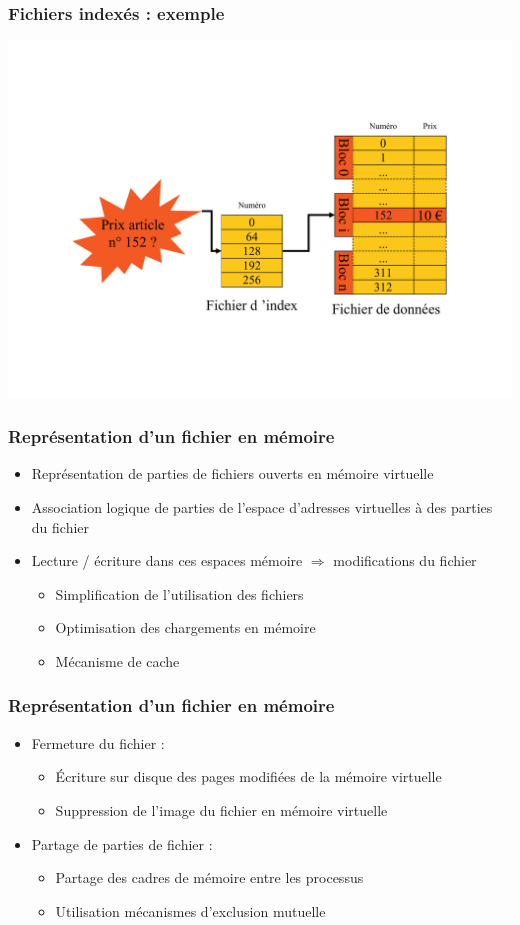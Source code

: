 \begin{frame}
\frametitle{Fichiers indexés : exemple}
\includegraphics[width=\textwidth]{../illustration/fichier_indexe_exemple.pdf} 
\end{frame}



\begin{frame}
\frametitle{Représentation d'un fichier en mémoire}
\begin{itemize}
\item Représentation de parties de fichiers ouverts en mémoire virtuelle
\item Association logique de parties de l'espace d'adresses virtuelles à des parties du fichier
\item Lecture / écriture dans ces espaces mémoire $\Longrightarrow$ modifications du fichier
\begin{itemize}
\item Simplification de l'utilisation des fichiers
\item Optimisation des chargements en mémoire
\item Mécanisme de cache
\end{itemize}
\end{itemize}
\end{frame}

\begin{frame}
\frametitle{Représentation d'un fichier en mémoire}
\begin{itemize}
\item Fermeture du fichier :
\begin{itemize}
\item Écriture sur disque des pages modifiées de la mémoire virtuelle
\item Suppression de l'image du fichier en mémoire virtuelle
\end{itemize}
\item Partage de parties de fichier :
\begin{itemize}
\item Partage des cadres de mémoire entre les processus
\item Utilisation mécanismes d'exclusion mutuelle
\end{itemize}
\end{itemize}
\end{frame}


